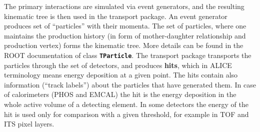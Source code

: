 \documentclass[12pt,a4paper,twoside]{article}
\newcommand{\class}[1]{\texttt{\textbf{#1}}\xspace}
\begin{document}
The primary  interactions are simulated via event  generators, and the
resulting kinematic  tree is then  used in the transport  package.  An
event generator produces set  of ``particles'' with their momenta. The
set of particles, where one  maintains the production history (in form
of  mother-daughter  relationship  and  production vertex)  forms  the
kinematic tree. More details can be found in the ROOT documentation of
class  \class{TParticle}.    The  transport  package   transports  the
particles through  the set  of detectors, and  produces \textbf{hits},
which  in  ALICE  terminology  means  energy  deposition  at  a  given
point. The hits contain  also information (``track labels'') about the
particles that have generated them.  In case of calorimeters (PHOS and
EMCAL) the hit is the energy  deposition in the whole active volume of
a detecting element.  In some detectors the energy of  the hit is used
only for comparison with a given threshold, for example in TOF and ITS
pixel layers.
\end{document}
